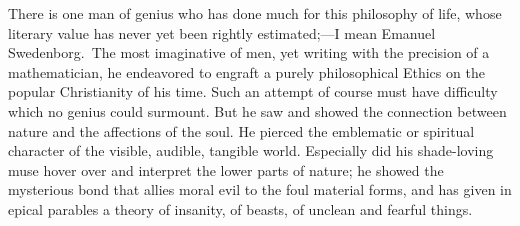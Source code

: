 There is one man of genius who has done much for this philosophy of
life, whose literary value has never yet been rightly estimated;---I
mean Emanuel Swedenborg. The most imaginative of men, yet writing with
the precision of a mathematician, he endeavored to engraft a purely
philosophical Ethics on the popular Christianity of his time. Such an
attempt of course must have difficulty which no genius 
could surmount. But he saw and showed the connection between nature
and the affections of the soul. He pierced the emblematic or spiritual
character of the visible, audible, tangible world. Especially did his
shade-loving muse hover over and interpret the lower parts of nature;
he showed the mysterious bond that allies moral evil to the foul
material forms, and has given in epical parables a theory of insanity,
of beasts, of unclean and fearful things.

